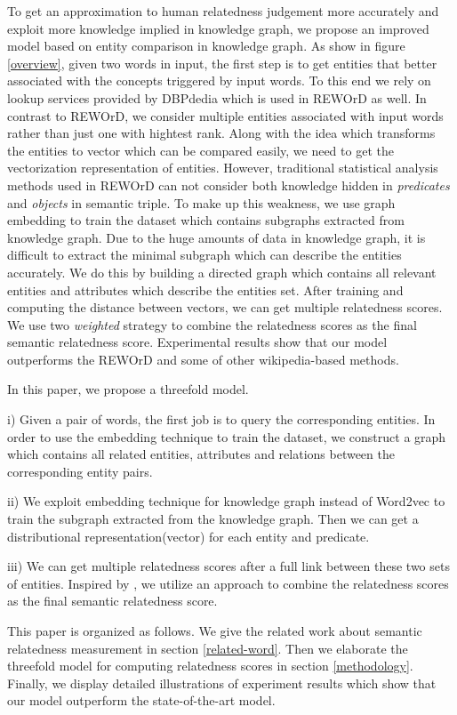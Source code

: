 To get an approximation to human relatedness judgement more accurately and exploit more knowledge implied in knowledge graph,
we propose an improved model based on entity comparison in knowledge graph. 
As show in figure \ref{overview}, given two words in input, the first step is to get entities that better associated with 
the concepts triggered by input words. To this end we rely on lookup services provided by DBPdedia which is used in REWOrD as well. 
In contrast to REWOrD, we consider multiple entities associated with input words rather than just one with hightest rank.
Along with the idea which transforms the entities to vector which can be compared easily, we need to get the vectorization representation
of entities. However, traditional statistical analysis methods used in REWOrD can not consider both knowledge hidden in \emph{predicates}
and \emph{objects} in semantic triple. To make up this weakness, we use graph embedding to train the dataset which contains subgraphs
extracted from knowledge graph. Due to the huge amounts of data in knowledge graph, it is difficult to extract the minimal subgraph which
can describe the entities accurately. We do this by building a directed graph which contains all relevant entities and attributes which
describe the entities set. After training and computing the distance between vectors, we can get multiple relatedness scores.
We use two \emph{weighted} strategy to combine the relatedness scores as the final semantic relatedness score. Experimental
results show that our model outperforms the REWOrD and some of other wikipedia-based methods.

In this paper, we propose a threefold model.

i) Given a pair of words, the first job is to query the corresponding entities. In order to use the
embedding technique to train the dataset, we construct a graph which contains all related
entities, attributes and relations between the corresponding entity pairs.

ii) We exploit embedding technique for knowledge graph instead of Word2vec to train the subgraph
extracted from the knowledge graph. Then we can get a distributional representation(vector) for each
entity and predicate.

iii) We can get multiple relatedness scores after a full link between these two sets of entities.
Inspired by \cite{acl/IacobacciPN15}, we utilize an approach to combine the relatedness scores as the final semantic relatedness score.

This paper is organized as follows. We give the related work about semantic relatedness
measurement in section \ref{related-word}. Then we elaborate the threefold model for
computing relatedness scores in section \ref{methodology}. Finally, we display detailed
illustrations of experiment results which show that our model outperform the state-of-the-art model.

